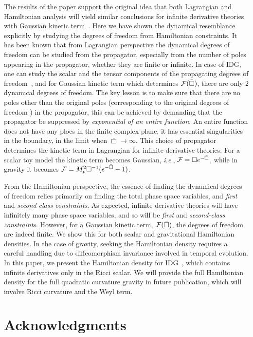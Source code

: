 \documentclass[a4paper,12pt]{article}
\newcommand{\bbox}{\bar{\Box}}
\newcommand{\+}{^{\dagger}}
\newcommand{\2}{\frac{1}{2}}
\newcommand{\3}{\frac{1}{3}}
\newcommand{\4}{\frac{1}{4}}
\newcommand{\6}{\frac{1}{6}}
\newcommand{\8}{\frac{1}{8}}
\begin{document}
The results of the paper support the original idea that both Lagrangian and Hamiltonian analysis will yield similar conclusions for infinite derivative theories with Gaussian kinetic term~\cite{Biswas:2005qr}. Here we have shown the dynamical resemblance explicitly by studying the degrees of freedom from 
Hamiltonian constraints. It has been known that from Lagrangian perspective the dynamical degrees of freedom can be studied from the propagator, especially from the number of poles appearing in the propagator, whether they are finite or infinite. In case of IDG, one can study the 
scalar and the tensor components of the propagating degrees of freedom~\cite{Biswas:2011ar,Biswas:2013kla}, and for Gaussian kinetic term which determines
 ${\cal F}(\bbox)$, there are only $2$ dynamical degrees of freedom. The key lesson is to make sure that there are no poles other than the original poles (corresponding to the original degrees of freedom ) in the propagator, this can be achieved by 
demanding that the propagator be suppressed by {\it exponential of an entire function}. An entire function does not have any ploes in the finite complex plane, it has essential singularities in the boundary, in the limit when $\bbox \rightarrow \infty$. This choice of propagator determines the kinetic term in Lagrangian for infinite derivative theories. For a scalar toy model the kinetic term becomes Gaussian, \textit{i.e.}, ${\cal F}=\Box e^{-\bbox}$, while in gravity it becomes $ {\cal F}=M_{p}^{2}\Box^{-1}(e^{-\bbox}-1)$.
 
 From the Hamiltonian perspective, the essence of finding the dynamical degrees of freedom relies primarily on finding the total phase space variables, and {\it first} and {\it second-class constraints}. As expected, infinite derivative theories  will have infinitely many phase space variables, and so will be {\it first} and {\it second-class constraints}. However,  for a Gaussian kinetic term, ${\cal F}(\bbox)$, the degrees of freedom are indeed finite. We show this for both scalar and  gravitational Hamiltonian densities. In the case of gravity, seeking the Hamiltonian density requires a careful handling due to diffeomorphism invariance involved in temporal evolution. In this paper, we present the Hamiltonian density for IDG~\cite{Biswas:2005qr}, which contains infinite derivatives only in the Ricci scalar. We will provide the full Hamiltonian density for the full quadratic curvature gravity in future publication, which will involve Ricci curvature and the Weyl term.


\section*{Acknowledgments}
\end{document}
